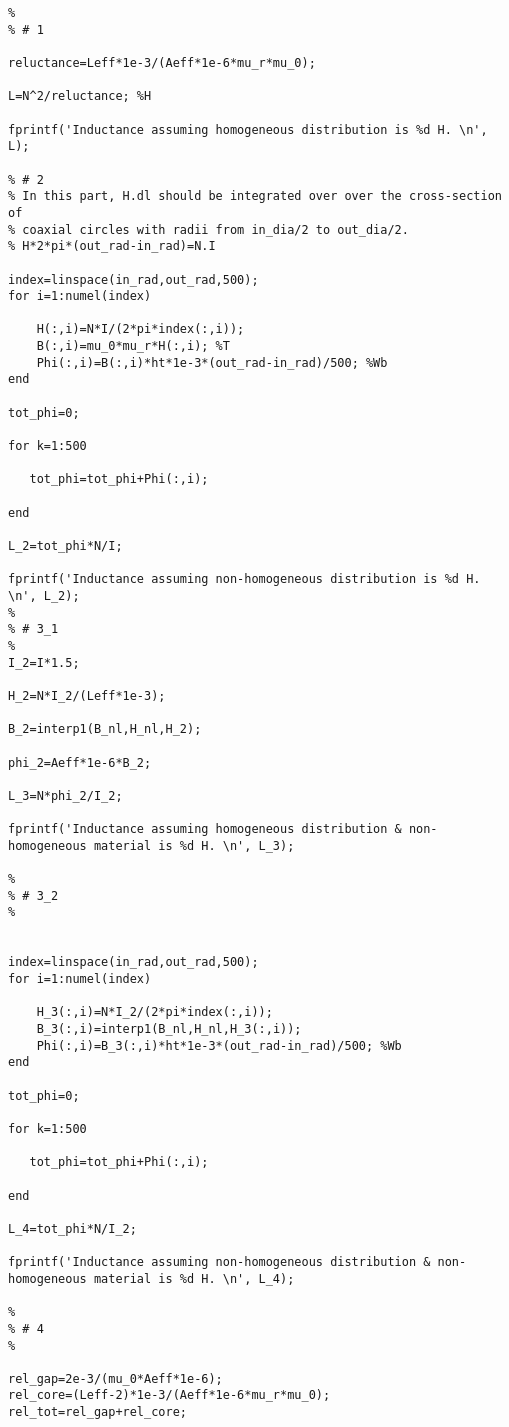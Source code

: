 \begin{verbatim}
%
% # 1

reluctance=Leff*1e-3/(Aeff*1e-6*mu_r*mu_0);

L=N^2/reluctance; %H

fprintf('Inductance assuming homogeneous distribution is %d H. \n', L);

% # 2
% In this part, H.dl should be integrated over over the cross-section of
% coaxial circles with radii from in_dia/2 to out_dia/2.
% H*2*pi*(out_rad-in_rad)=N.I

index=linspace(in_rad,out_rad,500);
for i=1:numel(index)

    H(:,i)=N*I/(2*pi*index(:,i));
    B(:,i)=mu_0*mu_r*H(:,i); %T
    Phi(:,i)=B(:,i)*ht*1e-3*(out_rad-in_rad)/500; %Wb
end

tot_phi=0;

for k=1:500

   tot_phi=tot_phi+Phi(:,i);

end

L_2=tot_phi*N/I;

fprintf('Inductance assuming non-homogeneous distribution is %d H. \n', L_2);
%
% # 3_1
%
I_2=I*1.5;

H_2=N*I_2/(Leff*1e-3);

B_2=interp1(B_nl,H_nl,H_2);

phi_2=Aeff*1e-6*B_2;

L_3=N*phi_2/I_2;

fprintf('Inductance assuming homogeneous distribution & non-homogeneous material is %d H. \n', L_3);

%
% # 3_2
%


index=linspace(in_rad,out_rad,500);
for i=1:numel(index)

    H_3(:,i)=N*I_2/(2*pi*index(:,i));
    B_3(:,i)=interp1(B_nl,H_nl,H_3(:,i));
    Phi(:,i)=B_3(:,i)*ht*1e-3*(out_rad-in_rad)/500; %Wb
end

tot_phi=0;

for k=1:500

   tot_phi=tot_phi+Phi(:,i);

end

L_4=tot_phi*N/I_2;

fprintf('Inductance assuming non-homogeneous distribution & non-homogeneous material is %d H. \n', L_4);

%
% # 4
%

rel_gap=2e-3/(mu_0*Aeff*1e-6);
rel_core=(Leff-2)*1e-3/(Aeff*1e-6*mu_r*mu_0);
rel_tot=rel_gap+rel_core;


\end{verbatim}
